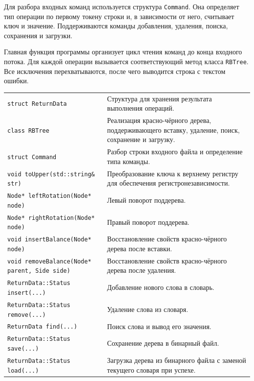 Для разбора входных команд используется структура \texttt{Command}. Она определяет тип операции по первому токену строки и, в зависимости от него, считывает ключ и значение. Поддерживаются команды добавления, удаления, поиска, сохранения и загрузки.

Главная функция программы организует цикл чтения команд до конца входного потока. Для каждой операции вызывается соответствующий метод класса \texttt{RBTree}. Все исключения перехватываются, после чего выводится строка с текстом ошибки.

\begin{longtable}{|p{6.8cm}|p{8.2cm}|}
\hline
\rowcolor{lightgray}
\multicolumn{2}{|c|}{main.cpp}\\
\hline
\texttt{struct ReturnData}&Структура для хранения результата выполнения операций.\\
\hline
\texttt{class RBTree}&Реализация красно-чёрного дерева, поддерживающего вставку, удаление, поиск, сохранение и загрузку.\\
\hline
\texttt{struct Command}&Разбор строки входного файла и определение типа команды.\\
\hline
\texttt{void toUpper(std::string\& str)}&Преобразование ключа к верхнему регистру для обеспечения регистронезависимости.\\
\hline
\texttt{Node* leftRotation(Node* node)}&Левый поворот поддерева.\\
\hline
\texttt{Node* rightRotation(Node* node)}&Правый поворот поддерева.\\
\hline
\texttt{void insertBalance(Node* node)}&Восстановление свойств красно-чёрного дерева после вставки.\\
\hline
\texttt{void removeBalance(Node* parent, Side side)}&Восстановление свойств красно-чёрного дерева после удаления.\\
\hline
\texttt{ReturnData::Status insert(...)}&Добавление нового слова в словарь.\\
\hline
\texttt{ReturnData::Status remove(...)}&Удаление слова из словаря.\\
\hline
\texttt{ReturnData find(...)}&Поиск слова и вывод его значения.\\
\hline
\texttt{ReturnData::Status save(...)}&Сохранение дерева в бинарный файл.\\
\hline
\texttt{ReturnData::Status load(...)}&Загрузка дерева из бинарного файла с заменой текущего словаря при успехе.\\
\hline
\end{longtable}


